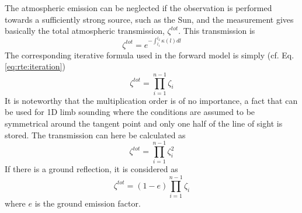  The atmospheric emission can be neglected if the observation is
 performed towards a sufficiently strong source, such as the Sun, and
 the measurement gives basically the total atmospheric transmission,
 $\zeta^{tot}$. This transmission is
 \begin{equation}
   \zeta^{tot} = e^{-\int_{l_1}^{l_2}{\kappa(l)dl}}
  \label{eq:rte:tottrans}
 \end{equation}
 The corresponding iterative formula used in the forward model is
 simply (cf. Eq. \ref{eq:rte:iteration})
 \begin{equation}
   \zeta^{tot} = \prod_{i=1}^{n-1}\zeta_{i}
 \end{equation} 
 It is noteworthy that the multiplication order
 is of no importance, a fact that can be used for 1D limb sounding where
 the conditions are assumed to be symmetrical around the tangent point and
 only one half of the line of sight is stored. The transmission can here be 
 calculated as
 \begin{equation}
   \zeta^{tot} = \prod_{i=1}^{n-1}\zeta_{i}^2
 \end{equation} 
 If there is a ground reflection, it is considered as
 \begin{equation}
   \zeta^{tot} = (1-e)\prod_{i=1}^{n-1}\zeta_{i}
  \label{eq:rte:tground}
 \end{equation} 
 where $e$ is the ground emission factor.
 
  


